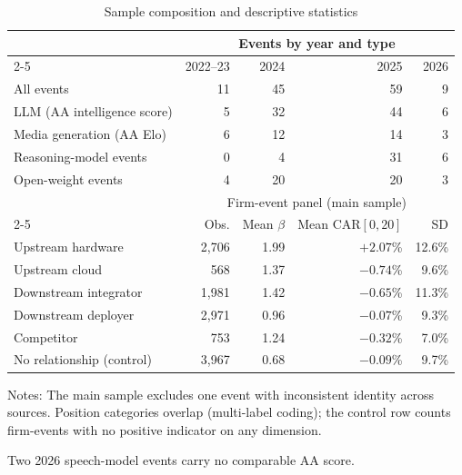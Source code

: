 \documentclass[review,12pt,authoryear]{elsarticle}
\begin{document}
\begin{table}[t!]
\centering
\begin{threeparttable}
\caption{Sample composition and descriptive statistics}\label{tab:desc}
\small
\begin{tabular}{lrrrr}
\toprule
 & \multicolumn{4}{c}{Events by year and type} \\
\cmidrule(lr){2-5}
 & 2022--23 & 2024 & 2025 & 2026 \\
\midrule
All events            & 11  & 45  & 59  & 9 \\
\quad LLM (AA intelligence score)   & 5   & 32  & 44  & 6\tnote{a} \\
\quad Media generation (AA Elo)     & 6   & 12  & 14  & 3 \\
\quad Reasoning-model events        & 0   & 4   & 31  & 6 \\
\quad Open-weight events            & 4   & 20  & 20  & 3 \\
\midrule
 & \multicolumn{4}{c}{Firm-event panel (main sample)} \\
\cmidrule(lr){2-5}
 & Obs. & Mean $\beta$ & Mean CAR$[0,20]$ & SD \\
\midrule
Upstream hardware   & 2{,}706 & 1.99 & $+2.07$\% & 12.6\% \\
Upstream cloud      & \phantom{0,}568  & 1.37 & $-0.74$\% & 9.6\% \\
Downstream integrator & 1{,}981 & 1.42 & $-0.65$\% & 11.3\% \\
Downstream deployer & 2{,}971 & 0.96 & $-0.07$\% & 9.3\% \\
Competitor          & \phantom{0,}753  & 1.24 & $-0.32$\% & 7.0\% \\
No relationship (control) & 3{,}967 & 0.68 & $-0.09$\% & 9.7\% \\
\bottomrule
\end{tabular}
\begin{tablenotes}\footnotesize
\item Notes: The main sample excludes one event with inconsistent identity
across sources. Position categories overlap (multi-label coding); the control
row counts firm-events with no positive indicator on any dimension.
\item[a] Two 2026 speech-model events carry no comparable AA score.
\end{tablenotes}
\end{threeparttable}
\end{table}

\end{document}
